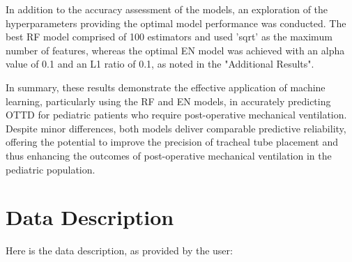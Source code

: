 \documentclass[11pt]{article}
\begin{document}
In addition to the accuracy assessment of the models, an exploration of the hyperparameters providing the optimal model performance was conducted. The best RF model comprised of 100 estimators and used 'sqrt' as the maximum number of features, whereas the optimal EN model was achieved with an alpha value of 0.1 and an L1 ratio of 0.1, as noted in the "Additional Results".

In summary, these results demonstrate the effective application of machine learning, particularly using the RF and EN models, in accurately predicting OTTD for pediatric patients who require post-operative mechanical ventilation. Despite minor differences, both models deliver comparable predictive reliability, offering the potential to improve the precision of tracheal tube placement and thus enhancing the outcomes of post-operative mechanical ventilation in the pediatric population.


\clearpage
\appendix

\section{Data Description} \label{sec:data_description} Here is the data description, as provided by the user:
\end{document}
